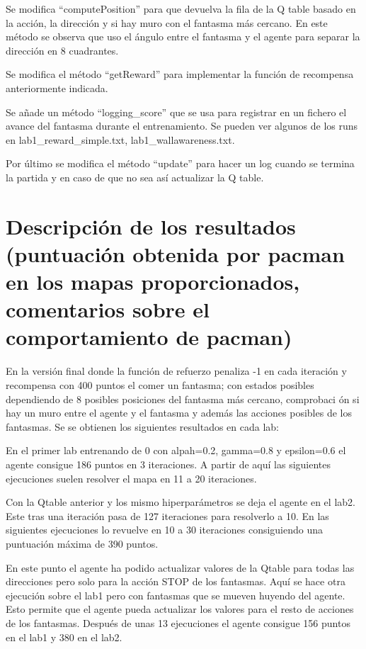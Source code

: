 \documentclass[12pt]{article}
\begin{document}
    Se modifica ``computePosition'' para que devuelva la fila de la Q table basado en la acción, la dirección y si hay
    muro con el fantasma más cercano.
    En este método se observa que uso el ángulo entre el fantasma y el agente para separar la dirección
    en 8 cuadrantes.

    Se modifica el método ``getReward'' para implementar la función de recompensa anteriormente indicada.

    Se añade un método ``logging\_score'' que se usa para registrar en un fichero el avance del fantasma durante el
    entrenamiento.
    Se pueden ver algunos de los runs en lab1\_reward\_simple.txt, lab1\_wallawareness.txt.

    Por último se modifica el método ``update'' para hacer un log cuando se termina la partida y en caso de que no
    sea así actualizar la Q table.

    \section{Descripción de los resultados (puntuación obtenida por pacman en los mapas proporcionados, comentarios
    sobre el comportamiento de pacman)}
    En la versión final donde la función de refuerzo penaliza -1 en cada iteración y recompensa con 400 puntos el
    comer un fantasma; con estados posibles dependiendo de 8 posibles posiciones del fantasma más cercano, comprobaci
    ón si hay un muro entre el agente y el fantasma y además las acciones posibles de los fantasmas.
    Se se obtienen los siguientes resultados en cada lab:

    En el primer lab entrenando de 0 con alpah=0.2, gamma=0.8 y epsilon=0.6 el agente consigue 186 puntos en 3
    iteraciones.
    A partir de aquí las siguientes ejecuciones suelen resolver el mapa en 11 a 20 iteraciones.

    Con la Qtable anterior y los mismo hiperparámetros se deja el agente en el lab2.
    Este tras una iteración pasa de 127 iteraciones para resolverlo a 10.
    En las siguientes ejecuciones lo revuelve en 10 a 30 iteraciones consiguiendo una puntuación máxima de 390 puntos.

    En este punto el agente ha podido actualizar valores de la Qtable para todas las direcciones pero
    solo para la acción STOP de los fantasmas.
    Aquí se hace otra ejecución sobre el lab1 pero con fantasmas que se mueven huyendo del agente.
    Esto permite que el agente pueda actualizar los valores para el resto de acciones de los fantasmas.
    Después de unas 13 ejecuciones el agente consigue 156 puntos en el lab1 y 380 en el lab2.
\end{document}
